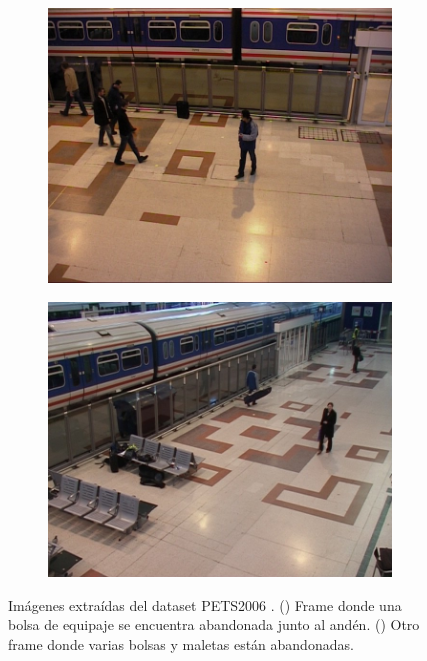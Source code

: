 \begin{figure}[ht]
  \centering
  \begin{subfigure}[b]{0.4\textwidth}
    \includegraphics[width=\textwidth]{img/chapters/resultados/bases-datos/pets2006_1.jpeg}
    \caption{}
    \label{fig:pets2006_1}
  \end{subfigure}
  \qquad\qquad
  \begin{subfigure}[b]{0.4\textwidth}
    \includegraphics[width=\textwidth]{img/chapters/resultados/bases-datos/pets2006_2.jpeg}
    \caption{}
    \label{fig:pets2006_2}
  \end{subfigure}
  \caption{Imágenes extraídas del dataset PETS2006 \cite{pets2006-dataset}.
    (\protect{}) Frame donde una bolsa de equipaje se encuentra abandonada junto al andén.
    (\protect{}) Otro frame donde varias bolsas y maletas están abandonadas.}
  \label{fig:pets2006}
\end{figure}

